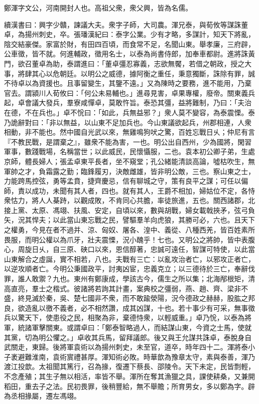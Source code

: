 
\begin{pinyinscope}
鄭渾字文公，河南開封人也。高祖父衆，衆父興，皆為名儒。

續漢書曰：興字少贛，諫議大夫。衆字子師，大司農。渾兄泰，與荀攸等謀誅董卓，為揚州刺史，卒。張璠漢紀曰：泰字公業。少有才略，多謀計，知天下將亂，陰交結豪傑。家富於財，有田四百頃，而食常不足，名聞山東。舉孝廉，三府辟，公車徵，皆不就。何進輔政，徵用名士，以泰為尚書侍郎，加奉車都尉。進將誅黃門，欲召董卓為助，泰謂進曰：「董卓彊忍寡義，志欲無饜，若借之朝政，授之大事，將肆其心以危朝廷。以明公之威德，據阿衡之重任，秉意獨斷，誅除有罪，誠不待卓以為資援也。且事留變生，其鑒不遠。」又為陳時之要務，進不能用，乃棄官去。謂潁川人荀攸曰：「何公未易輔也。」進尋見害，卓果專權，廢帝。關東義兵起，卓會議大發兵，羣寮咸憚卓，莫敢忤旨。泰恐其彊，益將難制，乃曰：「夫治在德，不在兵也。」卓不恱曰：「如此，兵無益邪？」衆人莫不變容，為泰震慄。泰乃詭辭對曰：「非以無益，以山東不足加兵也。今山東議欲起兵，州郡相連，人衆相動，非不能也。然中國自光武以來，無雞鳴狗吠之驚，百姓忘戰日乆；仲尼有言『不教民戰，是謂棄之』，雖衆不能為害，一也。明公出自西州，少為國將，閑習軍事，數踐戰場，名稱當世；以此威民，民懷懾服，二也。袁本初公卿子弟，生處京師，體長婦人；張孟卓東平長者，坐不窺堂；孔公緒能清談高論，噓枯吹生，無軍帥之才，負霜露之勤；臨鋒履刃，決敵雌雄，皆非明公敵，三也。察山東之士，力能跨馬控弦，勇等孟賁，捷齊慶忌，信有聊城之守，策有良平之謀；可任以偏師，責以成功，未聞有其人者，四也。就有其人，王爵不相加，婦姑位不定，各恃衆怙力，將人人棊跱，以觀成敗，不肯同心共膽，率徒旅進，五也。關西諸郡，北接上黨、太原、馮翊、扶風、安定，自頃以來，數與胡戰，婦女載戟挾矛，弦弓負矢，況其悍夫；以此當山東忘戰之民，譬驅羣羊向虎狼，其勝可必，六也。且天下之權勇，今見在者不過并、涼、匈奴、屠各、湟中、義從、八種西羌，皆百姓素所畏服，而明公權以為爪牙，壯夫震慄，況小醜乎！七也。又明公之將帥，皆中表腹心，周旋日乆，自三原、硤口以來，恩信醇著，忠誠可遠任，智謀可特使，以此當山東解合之虛誕，實不相若，八也。夫戰有三亡：以亂攻治者亡，以邪攻正者亡，以逆攻順者亡。今明公秉國政平，討夷凶宦，忠義克立；以三德待於三亡，奉辭伐罪，誰人敢禦？九也。東州有鄭康成，學該古今，儒生之所以集；北海邴根矩，清高直亮，羣士之楷式。彼諸將若詢其計畫，案典校之彊弱，燕、趙、齊、梁非不盛，終見滅於秦，吳、楚七國非不衆，而不敢踰滎陽，況今德政之赫赫，股肱之邦良，欲造亂以徼不義者，必不相然讚，成其凶謀，十也。若十事少有可采，無事徵兵以驚天下，使患役之民，相聚為非，棄德恃衆，以輕威重。」卓乃恱，以泰為將軍，統諸軍擊關東。或謂卓曰：「鄭泰智略過人，而結謀山東，今資之士馬，使就其黨，切為明公懼之。」卓收其兵馬，留拜議郎。後又與王允謀共誅卓，泰脫身自武關走，東歸。後將軍袁術以為揚州刺史，未至官，道卒，時年四十二。渾將泰小子袤避難淮南，袁術賔禮甚厚。渾知術必敗。時華歆為豫章太守，素與泰善，渾乃渡江投歆。太祖聞其篤行，召為掾，復遷下蔡長、邵陵令。天下未定，民皆剽輕，不念產殖；其生子無以相活，率皆不舉。渾所在奪其漁獵之具，課使耕桑，又兼開稻田，重去子之法。民初畏罪，後稍豐給，無不舉贍；所育男女，多以鄭為字。辟為丞相掾屬，遷左馮翊。


\end{pinyinscope}
